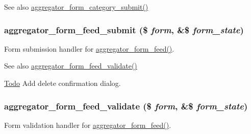 \begin{DoxySeeAlso}{See also}
\hyperlink{aggregator_8admin_8inc_a56c1cadf416d17bd8dd8a53cc6ed5aeb}{aggregator\_\-form\_\-category\_\-submit()} 
\end{DoxySeeAlso}
\hypertarget{aggregator_8admin_8inc_af98f428f07034e19622342875fe30984}{
\subsubsection[{aggregator\_\-form\_\-feed\_\-submit}]{\setlength{\rightskip}{0pt plus 5cm}aggregator\_\-form\_\-feed\_\-submit (\$ {\em form}, \/  \&\$ {\em form\_\-state})}}
\label{aggregator_8admin_8inc_af98f428f07034e19622342875fe30984}
Form submission handler for \hyperlink{group__forms_ga6c746c1b1d0d29d1564f215cd1fe69e3}{aggregator\_\-form\_\-feed()}.

\begin{DoxySeeAlso}{See also}
\hyperlink{aggregator_8admin_8inc_a4a4b42f6a1e73d72fb1e55c0f20fcf02}{aggregator\_\-form\_\-feed\_\-validate()}
\end{DoxySeeAlso}
\begin{Desc}
\item[\hyperlink{todo__todo000011}{Todo}]Add delete confirmation dialog. \end{Desc}
\hypertarget{aggregator_8admin_8inc_a4a4b42f6a1e73d72fb1e55c0f20fcf02}{
\subsubsection[{aggregator\_\-form\_\-feed\_\-validate}]{\setlength{\rightskip}{0pt plus 5cm}aggregator\_\-form\_\-feed\_\-validate (\$ {\em form}, \/  \&\$ {\em form\_\-state})}}
\label{aggregator_8admin_8inc_a4a4b42f6a1e73d72fb1e55c0f20fcf02}
Form validation handler for \hyperlink{group__forms_ga6c746c1b1d0d29d1564f215cd1fe69e3}{aggregator\_\-form\_\-feed()}.

